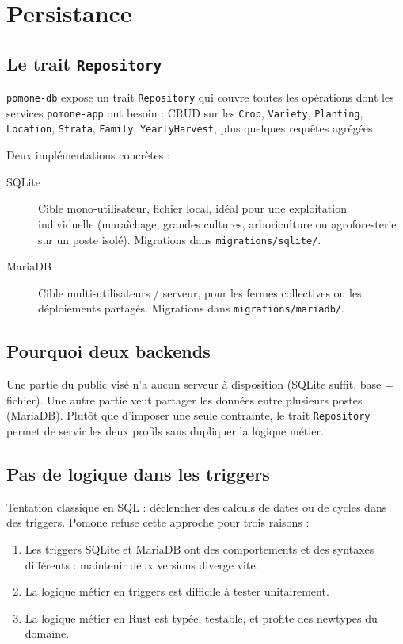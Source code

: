 \section{Persistance}

\subsection{Le trait \texttt{Repository}}

\texttt{pomone-db} expose un trait \texttt{Repository} qui couvre toutes les opérations dont les services \texttt{pomone-app} ont besoin : CRUD sur les \texttt{Crop}, \texttt{Variety}, \texttt{Planting}, \texttt{Location}, \texttt{Strata}, \texttt{Family}, \texttt{YearlyHarvest}, plus quelques requêtes agrégées.

Deux implémentations concrètes :

\begin{description}
  \item[SQLite] Cible mono-utilisateur, fichier local, idéal pour une exploitation individuelle (maraîchage, grandes cultures, arboriculture ou agroforesterie sur un poste isolé). Migrations dans \texttt{migrations/sqlite/}.
  \item[MariaDB] Cible multi-utilisateurs / serveur, pour les fermes collectives ou les déploiements partagés. Migrations dans \texttt{migrations/mariadb/}.
\end{description}

\subsection{Pourquoi deux backends}

Une partie du public visé n'a aucun serveur à disposition (SQLite suffit, base = fichier). Une autre partie veut partager les données entre plusieurs postes (MariaDB). Plutôt que d'imposer une seule contrainte, le trait \texttt{Repository} permet de servir les deux profils sans dupliquer la logique métier.

\subsection{Pas de logique dans les triggers}

Tentation classique en SQL : déclencher des calculs de dates ou de cycles dans des triggers. Pomone refuse cette approche pour trois raisons :

\begin{enumerate}
  \item Les triggers SQLite et MariaDB ont des comportements et des syntaxes différents : maintenir deux versions diverge vite.
  \item La logique métier en triggers est difficile à tester unitairement.
  \item La logique métier en Rust est typée, testable, et profite des newtypes du domaine.
\end{enumerate}

